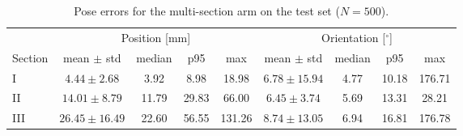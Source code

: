 \begin{table}[h]
\centering
\caption{Pose errors for the multi-section arm on the test set ($N = 500$).}
\label{tab:1}
\begin{tabular}{lcccc|cccc}
\toprule
 & \multicolumn{4}{c|}{Position [mm]} & \multicolumn{4}{c}{Orientation [$^\circ$]} \\
Section & mean $\pm$ std & median & p95 & max & mean $\pm$ std & median & p95 & max \\
\midrule
I & $4.44 \pm 2.68$ & 3.92 & 8.98 & 18.98 & $6.78 \pm 15.94$ & 4.77 & 10.18 & 176.71 \\
II & $14.01 \pm 8.79$ & 11.79 & 29.83 & 66.00 & $6.45 \pm 3.74$ & 5.69 & 13.31 & 28.21 \\
III & $26.45 \pm 16.49$ & 22.60 & 56.55 & 131.26 & $8.74 \pm 13.05$ & 6.94 & 16.81 & 176.78 \\
\bottomrule
\end{tabular}
\end{table}
